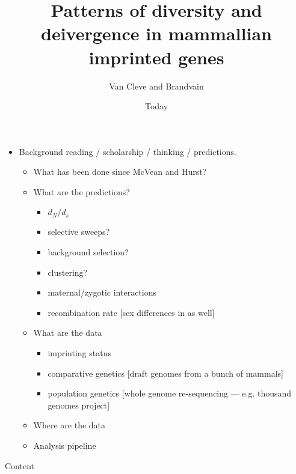 \documentclass[]{article}
\begin{document}
\title{Patterns of diversity and deivergence in mammallian imprinted genes}
\author{Van Cleve and Brandvain}
\date{Today}
\maketitle


\begin{itemize}
	\item Background reading / scholarship / thinking / predictions.
	\begin{itemize}
		\item What has been done since McVean and Hurst?
		\item What are the predictions? 
		\begin{itemize}
			\item $d_N/d_s$ 
			\item selective sweeps? 
			\item background selection? 
			\item clustering?  
			\item maternal/zygotic interactions
			\item recombination rate [sex differences in  as well]
		\end{itemize}
		\item What are the data
		\begin{itemize}
			\item imprinting status
			\item comparative genetics [draft genomes from a bunch of mammals]
			\item population genetics [whole genome re-sequencing --- e.g. thousand genomes project]
		\end{itemize}
		\item Where are the data
		\item Analysis pipeline
	\end{itemize}

\end{itemize}
Content
\end{document}
